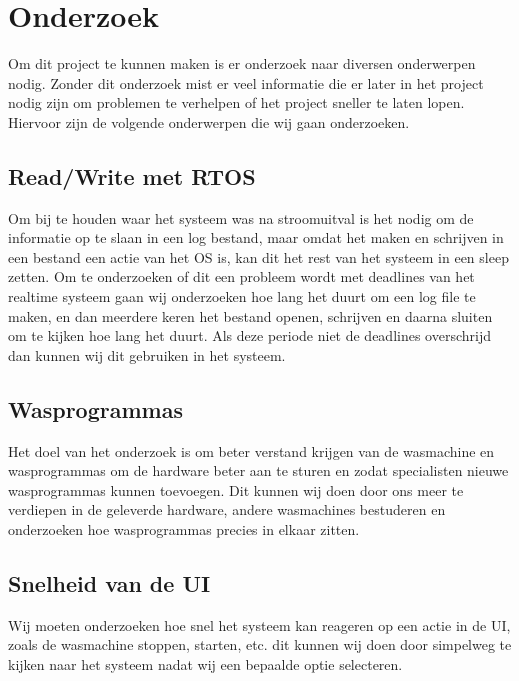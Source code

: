 \chapter{Onderzoek}
Om dit project te kunnen maken is er onderzoek naar diversen onderwerpen nodig. Zonder dit onderzoek mist er veel informatie die er later in het project nodig zijn om problemen te verhelpen of het project sneller te laten lopen.
Hiervoor zijn de volgende onderwerpen die wij gaan onderzoeken.

\section {Read/Write met RTOS}
Om bij te houden waar het systeem was na stroomuitval is het nodig om de informatie op te slaan in een log bestand, maar omdat het maken en schrijven in een 
bestand een actie van het OS is, kan dit het rest van het systeem in een sleep zetten. Om te onderzoeken of dit een probleem wordt met deadlines van het realtime systeem gaan wij 
onderzoeken hoe lang het duurt om een log file te maken, en dan meerdere keren het bestand openen, schrijven en daarna sluiten om te kijken hoe lang het duurt. Als deze periode niet de 
deadlines overschrijd dan kunnen wij dit gebruiken in het systeem.

\section{Wasprogrammas}
Het doel van het onderzoek is om beter verstand krijgen van de wasmachine en wasprogrammas om de hardware beter aan te sturen en zodat specialisten nieuwe wasprogrammas kunnen toevoegen.
Dit kunnen wij doen door ons meer te verdiepen in de geleverde hardware, andere wasmachines bestuderen en onderzoeken hoe wasprogrammas precies in elkaar zitten.

\section{Snelheid van de UI}
Wij moeten onderzoeken hoe snel het systeem kan reageren op een actie in de UI, zoals de wasmachine stoppen, starten, etc. dit kunnen wij doen door simpelweg te 
kijken naar het systeem nadat wij een bepaalde optie selecteren. 

